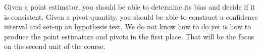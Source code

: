 \documentclass{tufte-handout}
\begin{document}
\vspace*{18pt}

\noindent
Given a point estimator, you should be able to determine its bias and
decide if it is consistent. Given a pivot quantity, you should be able
to construct a confidence interval and set-up an hypothesis test. We
do not know how to do yet is how to produce the point estimators and
pivots in the first place. That will be the focus on the second unit of
the course. 


\end{document}

